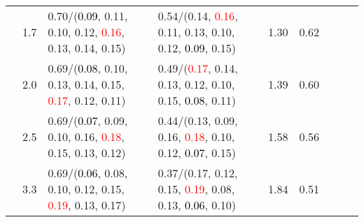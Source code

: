 \documentclass[10pt,a4paper]{report}
\begin{document}
\begin{table}[!htbp]
\begin{center}
{\begin{tabular}{ccllccccc}
				  & 1.7                               & 0.70/(\textcolor{black}{0.09}, 0.11, 0.10, 0.12, \textcolor{red}{0.16}, 0.13, 0.14, 0.15)                                                                                                     & 0.54/(0.14, \textcolor{red}{0.16}, 0.11, 0.13, 0.10, 0.12, \textcolor{black}{0.09}, 0.15)                                                                                                     & 1.30             & 0.62                     \\
				  & 2.0                               & 0.69/(\textcolor{black}{0.08}, 0.10, 0.13, 0.14, 0.15, \textcolor{red}{0.17}, 0.12, 0.11)                                                                                                     & 0.49/(\textcolor{red}{0.17}, 0.14, 0.13, 0.12, 0.10, 0.15, \textcolor{black}{0.08}, 0.11)                                                                                                     & 1.39             & 0.60                     \\
				  & 2.5                               & 0.69/(\textcolor{black}{0.07}, 0.09, 0.10, 0.16, \textcolor{red}{0.18}, 0.15, 0.13, 0.12)                                                                                                     & 0.44/(0.13, 0.09, 0.16, \textcolor{red}{0.18}, 0.10, 0.12, \textcolor{black}{0.07}, 0.15)                                                                                                     & 1.58             & 0.56                     \\
				  & 3.3                               & 0.69/(\textcolor{black}{0.06}, 0.08, 0.10, 0.12, 0.15, \textcolor{red}{0.19}, 0.13, 0.17)                                                                                                     & 0.37/(0.17, 0.12, 0.15, \textcolor{red}{0.19}, 0.08, 0.13, \textcolor{black}{0.06}, 0.10)                                                                                                     & 1.84             & 0.51                     \\
				\bottomrule
			\end{tabular}}
	\end{center}
\end{table}
\end{document}
